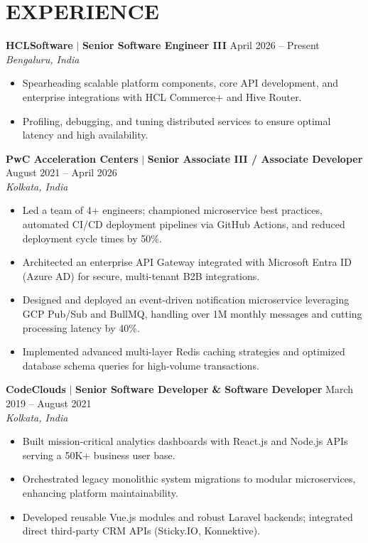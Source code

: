 \documentclass[10pt,letterpaper]{article}
\begin{document}
\section*{EXPERIENCE}

\noindent\textbf{\color{obsidian}HCLSoftware} $|$ {\color{cyanhighlight}\textbf{Senior Software Engineer III}} \hfill {\small\ttfamily\color{mutedslate}April 2026 -- Present} \\
{\small\textit{\color{mutedslate}Bengaluru, India}}
\begin{itemize}
    \item Spearheading scalable platform components, core API development, and enterprise integrations with HCL Commerce+ and Hive Router.
    \item Profiling, debugging, and tuning distributed services to ensure optimal latency and high availability.
\end{itemize}

\vspace{1ex}
\noindent\textbf{\color{obsidian}PwC Acceleration Centers} $|$ {\color{cyanhighlight}\textbf{Senior Associate III / Associate Developer}} \hfill {\small\ttfamily\color{mutedslate}August 2021 -- April 2026} \\
{\small\textit{\color{mutedslate}Kolkata, India}}
\begin{itemize}
    \item Led a team of 4+ engineers; championed microservice best practices, automated CI/CD deployment pipelines via GitHub Actions, and reduced deployment cycle times by 50\%.
    \item Architected an enterprise API Gateway integrated with Microsoft Entra ID (Azure AD) for secure, multi-tenant B2B integrations.
    \item Designed and deployed an event-driven notification microservice leveraging GCP Pub/Sub and BullMQ, handling over 1M monthly messages and cutting processing latency by 40\%.
    \item Implemented advanced multi-layer Redis caching strategies and optimized database schema queries for high-volume transactions.
\end{itemize}

\vspace{1ex}
\noindent\textbf{\color{obsidian}CodeClouds} $|$ {\color{cyanhighlight}\textbf{Senior Software Developer \& Software Developer}} \hfill {\small\ttfamily\color{mutedslate}March 2019 -- August 2021} \\
{\small\textit{\color{mutedslate}Kolkata, India}}
\begin{itemize}
    \item Built mission-critical analytics dashboards with React.js and Node.js APIs serving a 50K+ business user base.
    \item Orchestrated legacy monolithic system migrations to modular microservices, enhancing platform maintainability.
    \item Developed reusable Vue.js modules and robust Laravel backends; integrated direct third-party CRM APIs (Sticky.IO, Konnektive).
\end{itemize}
\end{document}
